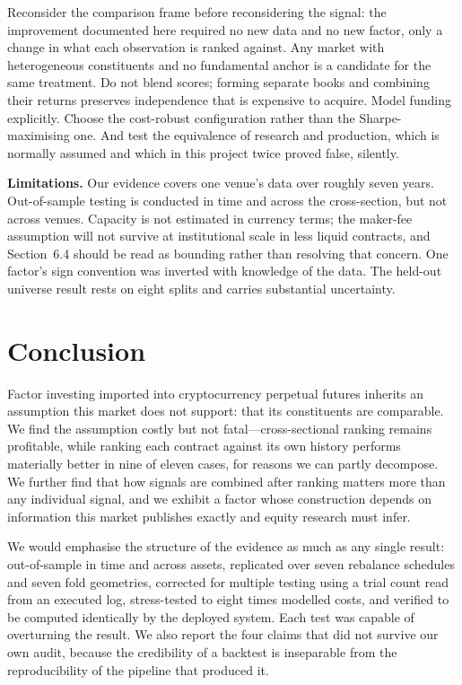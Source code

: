 \documentclass[11pt,letterpaper]{article}
\begin{document}
Reconsider the comparison frame before reconsidering the signal: the improvement
documented here required no new data and no new factor, only a change in what
each observation is ranked against. Any market with heterogeneous constituents
and no fundamental anchor is a candidate for the same treatment. Do not blend
scores; forming separate books and combining their returns preserves
independence that is expensive to acquire. Model funding explicitly. Choose the
cost-robust configuration rather than the Sharpe-maximising one. And test the
equivalence of research and production, which is normally assumed and which in
this project twice proved false, silently.

\textbf{Limitations.} Our evidence covers one venue's data over roughly seven
years. Out-of-sample testing is conducted in time and across the cross-section,
but not across venues. Capacity is not estimated in currency terms; the maker-fee
assumption will not survive at institutional scale in less liquid contracts, and
Section~6.4 should be read as bounding rather than resolving that concern. One
factor's sign convention was inverted with knowledge of the data. The held-out
universe result rests on eight splits and carries substantial uncertainty.

\section{Conclusion}

Factor investing imported into cryptocurrency perpetual futures inherits an
assumption this market does not support: that its constituents are comparable.
We find the assumption costly but not fatal---cross-sectional ranking remains
profitable, while ranking each contract against its own history performs
materially better in nine of eleven cases, for reasons we can partly decompose.
We further find that how signals are combined after ranking matters more than
any individual signal, and we exhibit a factor whose construction depends on
information this market publishes exactly and equity research must infer.

We would emphasise the structure of the evidence as much as any single result:
out-of-sample in time and across assets, replicated over seven rebalance
schedules and seven fold geometries, corrected for multiple testing using a
trial count read from an executed log, stress-tested to eight times modelled
costs, and verified to be computed identically by the deployed system. Each test
was capable of overturning the result. We also report the four claims that did
not survive our own audit, because the credibility of a backtest is inseparable
from the reproducibility of the pipeline that produced it.
\end{document}
